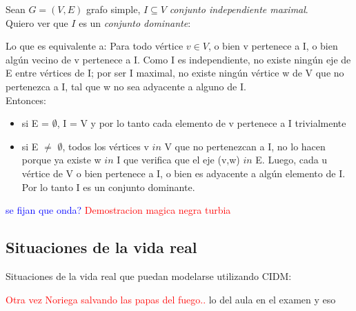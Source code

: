 Sean $G = (V, E)$ grafo simple, $I \subseteq V$ \emph{conjunto independiente maximal}.\\

Quiero ver que $I$ es un \emph{conjunto dominante}: 

Lo que es equivalente a:
Para todo v\'ertice $v \in V$, o bien v pertenece a I, o bien alg\'un vecino de v pertenece a I.
Como I es independiente, no existe ning\'un eje de E entre v\'ertices de I; por ser I maximal, no existe ning\'un v\'ertice w de V que no pertenezca a I, tal que w no sea adyacente a alguno de I.\\
Entonces:
\begin{itemize}
\item si E = $\emptyset$, I = V y por lo tanto cada elemento de v pertenece a I trivialmente
\item si E $\neq$ $\emptyset$, todos los v\'ertices v $in$ V que no pertenezcan a I, no lo hacen porque ya existe w $in$ I que verifica que el eje (v,w) $in$ E. Luego, cada u v\'ertice de V o bien pertenece a I, o bien es adyacente a alg\'un elemento de I. Por lo tanto I es un conjunto dominante.
\end{itemize}
\textcolor{blue}{se fijan que onda?}
\textcolor{red}{Demostracion magica negra turbia}

\subsection{Situaciones de la vida real}

Situaciones de la vida real que puedan modelarse utilizando CIDM:

\textcolor{red}{Otra vez Noriega salvando las papas del fuego..} lo del aula en el examen y eso